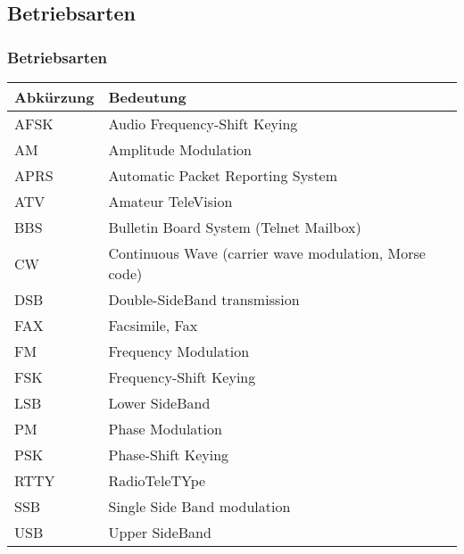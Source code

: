 \subsection*{Betriebsarten}
\begin{frame}
    \frametitle{Betriebsarten}

    \begin{center}
    \footnotesize
    \begin{tabular}{|l|l|}\hline
        \textbf{Abkürzung} & \textbf{Bedeutung}                         \\ \hline \hline
        AFSK  & Audio Frequency-Shift Keying                            \\ \hline
        AM    & Amplitude Modulation                                    \\ \hline
        APRS  & Automatic Packet Reporting System                       \\ \hline
        ATV   & Amateur TeleVision                                      \\ \hline
        BBS   & Bulletin Board System (Telnet Mailbox)                  \\ \hline
        CW    & Continuous Wave (carrier wave modulation, Morse code)   \\ \hline
        DSB   & Double-SideBand transmission                            \\ \hline
        FAX   & Facsimile, Fax                                          \\ \hline
        FM    & Frequency Modulation                                    \\ \hline
        FSK   & Frequency-Shift Keying                                  \\ \hline
        LSB   & Lower SideBand                                          \\ \hline
        PM    & Phase Modulation                                        \\ \hline
        PSK   & Phase-Shift Keying                                      \\ \hline
        RTTY  & RadioTeleTYpe                                           \\ \hline
        SSB   & Single Side Band modulation                             \\ \hline
        USB   & Upper SideBand                                          \\ \hline
    \end{tabular}
    \end{center}

\end{frame}

